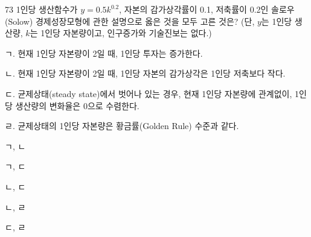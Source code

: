 \begin{question}{73}
1인당 생산함수가 $y=0.5k^{0.2}$, 자본의 감가상각률이 0.1, 저축률이 0.2인 솔로우(Solow) 경제성장모형에 관한 설명으로 옳은 것을 모두 고른 것은? (단, $y$는 1인당 생산량, $k$는 1인당 자본량이고, 인구증가와 기술진보는 없다.)
\begin{framedtext}
ㄱ. 현재 1인당 자본량이 2일 때, 1인당 투자는 증가한다. \par
ㄴ. 현재 1인당 자본량이 2일 때, 1인당 자본의 감가상각은 1인당 저축보다 작다. \par
ㄷ. 균제상태(steady state)에서 벗어나 있는 경우, 현재 1인당 자본량에 관계없이, 1인당 생산량의 변화율은 0으로 수렴한다. \par
ㄹ. 균제상태의 1인당 자본량은 황금률(Golden Rule) 수준과 같다. \par
\end{framedtext}
\begin{choices}
  \item ㄱ, ㄴ
  \item ㄱ, ㄷ
  \item ㄴ, ㄷ
  \item ㄴ, ㄹ
  \item ㄷ, ㄹ
\end{choices}
\end{question}
